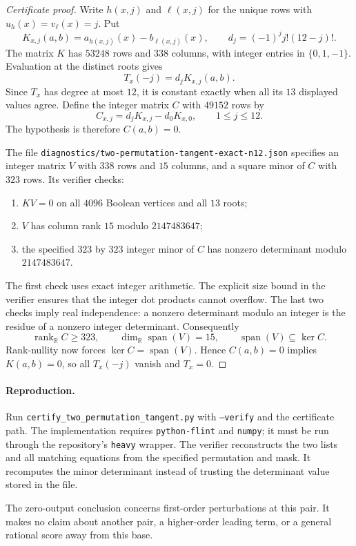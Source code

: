 \documentclass[11pt]{article}
\begin{document}
\begin{proof}[Certificate proof]
Write $h(x,j)$ and $\ell(x,j)$ for the unique rows with
$u_h(x)=v_\ell(x)=j$. Put
\[
 K_{x,j}(a,b)=a_{h(x,j)}(x)-b_{\ell(x,j)}(x),\qquad
 d_j=(-1)^j j!(12-j)!.
\]
The matrix $K$ has $53248$ rows and $338$ columns, with integer
entries in $\{0,1,-1\}$. Evaluation at the distinct roots gives
\[
                         T_x(-j)=d_jK_{x,j}(a,b).
\]
Since $T_x$ has degree at most $12$, it is constant exactly when
all its $13$ displayed values agree. Define the integer matrix $C$
with $49152$ rows by
\[
 C_{x,j}=d_jK_{x,j}-d_0K_{x,0},\qquad 1\le j\le12.
\]
The hypothesis is therefore $C(a,b)=0$.

The file
\texttt{diagnostics/two-permutation-tangent-exact-n12.json}
specifies an integer matrix $V$ with $338$ rows and $15$ columns,
and a square minor of $C$ with $323$ rows. Its verifier checks:
\begin{enumerate}
\item $KV=0$ on all $4096$ Boolean vertices and all $13$ roots;
\item $V$ has column rank $15$ modulo $2147483647$;
\item the specified $323$ by $323$ integer minor of $C$ has
nonzero determinant modulo $2147483647$.
\end{enumerate}
The first check uses exact integer arithmetic. The explicit size bound
in the verifier ensures that the integer dot products cannot overflow.
The last two checks imply real independence: a nonzero determinant
modulo an integer is the residue of a nonzero integer determinant.
Consequently
\[
 \operatorname{rank}_{\mathbb R}C\ge323,\qquad
 \dim_{\mathbb R}\operatorname{span}(V)=15,
 \qquad \operatorname{span}(V)\subseteq\ker C.
\]
Rank-nullity now forces $\ker C=\operatorname{span}(V)$. Hence
$C(a,b)=0$ implies $K(a,b)=0$, so all $T_x(-j)$ vanish and
$T_x=0$.
\end{proof}

\paragraph{Reproduction.}
Run \texttt{certify\_two\_permutation\_tangent.py} with
\texttt{--verify} and the certificate path. The implementation
requires \texttt{python-flint} and \texttt{numpy}; it must be run
through the repository's \texttt{heavy} wrapper. The verifier
reconstructs the two lists and all matching equations from the
specified permutation and mask. It recomputes the minor determinant
instead of trusting the determinant value stored in the file.

The zero-output conclusion concerns first-order perturbations at
this pair. It makes no claim about another pair, a higher-order
leading term, or a general rational score away from this base.
\end{document}

